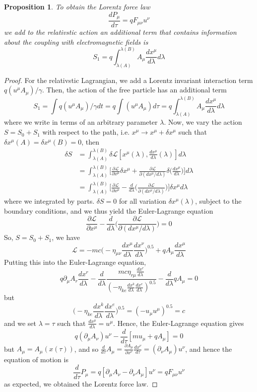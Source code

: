 \documentclass[a4paper]{article}
\theoremstyle{new}
\newtheorem{prop}{Proposition}[section]
\begin{document}
\begin{prop}
To obtain the Lorentz force law
$$\frac{dP_\mu}{d\tau}=qF_{\mu\nu}u^\nu$$
we add to the relativstic action an additional term that contains information about the coupling with electromagnetic fields is
$$S_1=q\int_{\lambda(A)}^{\lambda(B)}A_\mu\frac{dx^\mu}{d\lambda}d\lambda$$
\end{prop}
\begin{proof}
For the relativstic Lagrangian, we add a Lorentz invariant interaction term $q(u^\mu A_\mu)/\gamma$. Then, the action of the free particle has an additional term
$$S_1=\int q(u^\mu A_\mu)/\gamma dt=q\int (u^\mu A_\mu)d\tau=q\int_{\lambda(A)}^{\lambda(B)}A_\mu\frac{dx^\mu}{d\lambda}d\lambda$$
where we write in terms of an arbitrary parameter $\lambda$. Now, we vary the action $S=S_0+S_1$ with respect to the path, i.e. $x^\mu\rightarrow x^\mu+\delta x^\mu$ such that $\delta x^\mu(A)=\delta x^\mu(B)=0$, then
\begin{align}
\delta S&=\int_{\lambda(A)}^{\lambda(B)}\delta\mathcal{L}[x^\mu(\lambda),\frac{dx^\mu}{d\lambda}(\lambda)]d\lambda\nonumber\\&=\int_{\lambda(A)}^{\lambda(B)}\bigg[\frac{\partial\mathcal{L}}{\partial x^\mu}\delta x^\mu+\frac{\partial\mathcal{L}}{\partial(dx^\mu/d\lambda)}\delta\bigg(\frac{dx^\mu}{d\lambda}\bigg)\bigg]d\lambda\nonumber\\&=\int_{\lambda(A)}^{\lambda(B)}\bigg[\frac{\partial\mathcal{L}}{\partial x^\mu}-\frac{d}{d\lambda}\bigg(\frac{\partial\mathcal{L}}{\partial(dx^\mu/d\lambda)}\bigg)\bigg]\delta x^\mu d\lambda\nonumber
\end{align}
where we integrated by parts. $\delta S=0$ for all variation $\delta x^\mu(\lambda)$, subject to the boundary conditions, and we thus yield the Euler-Lagrange equation
$$\frac{\partial\mathcal{L}}{\partial x^\mu}-\frac{d}{d\lambda}\bigg(\frac{\partial\mathcal{L}}{\partial(dx^\mu/d\lambda)}\bigg)=0$$
So, $S=S_0+S_1$, we have
$$\mathcal{L}=-mc\bigg(-\eta_{\mu\nu}\frac{dx^\mu}{d\lambda}\frac{dx^\nu}{d\lambda}\bigg)^{0.5}+qA_\mu\frac{dx^\mu}{d\lambda}$$
Putting this into the Euler-Lagrange equation,
$$q\partial_\mu A_r\frac{dx^r}{d\lambda}-\frac{d}{d\lambda}\frac{mc\eta_{r\mu}\frac{dx^r}{d\lambda}}{(-\eta_{ke}\frac{dx^k}{d\lambda}\frac{dx^e}{d\lambda})^{0.5}}-\frac{d}{d\lambda}qA_\mu=0$$
but 
$$\bigg(-\eta_{ke}\frac{dx^k}{d\lambda}\frac{dx^e}{d\lambda}\bigg)^{0.5}=(-u_\mu u^\mu)^{0.5}=c$$
and we set $\lambda=\tau$ such that $\frac{dx^\mu}{d\lambda}=u^\mu$. Hence, the Euler-Lagrange equation gives
$$q(\partial_\mu A_\nu)u^\nu-\frac{d}{d\tau}[mu_\mu+qA_\mu]=0$$
but $A_\mu=A_\mu(x(\tau))$, and so $\frac{d}{d\tau}A_\mu=\frac{\partial A_\mu}{\partial x^\nu}\frac{dx^\nu}{d\tau}=(\partial_\nu A_\mu)u^\nu$, and hence the equation of motion is
$$\frac{d}{d\tau} P_\mu=q[\partial_\mu A_\nu-\partial_\nu A_\mu]u^\nu=qF_{\mu\nu}u^\nu$$
as expected, we obtained the Lorentz force law.
\end{proof}
\end{document}
